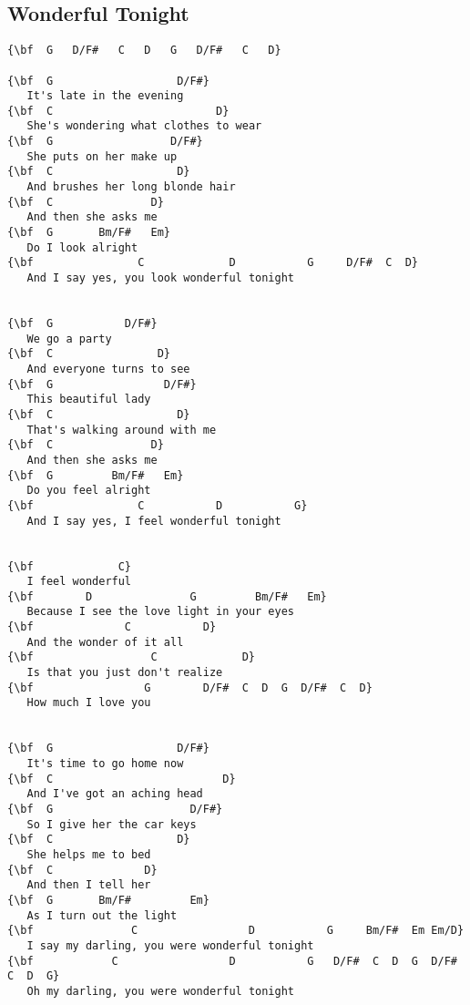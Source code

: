\documentclass[a4paper]{article}
\begin{document}
\subsection{Wonderful Tonight}
\begin{Verbatim}[commandchars=\\\{\}]
{\bf  G   D/F#   C   D   G   D/F#   C   D}

{\bf  G                   D/F#}
   It's late in the evening
{\bf  C                         D}
   She's wondering what clothes to wear
{\bf  G                  D/F#}
   She puts on her make up
{\bf  C                   D}
   And brushes her long blonde hair
{\bf  C               D}
   And then she asks me
{\bf  G       Bm/F#   Em}
   Do I look alright
{\bf                C             D           G     D/F#  C  D}
   And I say yes, you look wonderful tonight


{\bf  G           D/F#}
   We go a party
{\bf  C                D}
   And everyone turns to see
{\bf  G                 D/F#}
   This beautiful lady
{\bf  C                   D}
   That's walking around with me
{\bf  C               D}
   And then she asks me
{\bf  G         Bm/F#   Em}
   Do you feel alright
{\bf                C           D           G}
   And I say yes, I feel wonderful tonight


{\bf             C}
   I feel wonderful
{\bf        D               G         Bm/F#   Em}
   Because I see the love light in your eyes
{\bf              C           D}
   And the wonder of it all
{\bf                  C             D}
   Is that you just don't realize
{\bf                 G        D/F#  C  D  G  D/F#  C  D}
   How much I love you


{\bf  G                   D/F#}
   It's time to go home now
{\bf  C                          D}
   And I've got an aching head
{\bf  G                     D/F#}
   So I give her the car keys
{\bf  C                   D}
   She helps me to bed
{\bf  C              D}
   And then I tell her
{\bf  G       Bm/F#         Em}
   As I turn out the light
{\bf               C                 D           G     Bm/F#  Em Em/D}
   I say my darling, you were wonderful tonight
{\bf            C                 D           G   D/F#  C  D  G  D/F#  C  D  G}
   Oh my darling, you were wonderful tonight

\end{Verbatim}
\newpage
\end{document}
